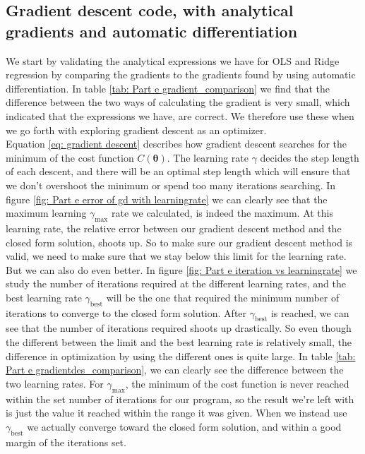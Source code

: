 \documentclass[reprint,english,notitlepage]{revtex4-2}  %
\begin{document}
\subsection{Gradient descent code, with analytical gradients and automatic differentiation} %

We start by validating the analytical expressions we have for OLS and Ridge regression by comparing the gradients to the gradients found by using automatic differentiation. In table \ref{tab: Part e gradient_comparison} we find that the difference between the two ways of calculating the gradient is very small, which indicated that the expressions we have, are correct. We therefore use these when we go forth with exploring gradient descent as an optimizer. \\
Equation \ref{eq: gradient descent} describes how gradient descent searches for the minimum of the cost function $C(\bm{\theta})$. The learning rate $\gamma$ decides the step length of each descent, and there will be an optimal step length which will ensure that we don't overshoot the minimum or spend too many iterations searching. In figure \ref{fig: Part e error of gd with learningrate} we can clearly see that the maximum learning $\gamma_{\text{max}}$ rate we calculated, is indeed the maximum. At this learning rate, the relative error between our gradient descent method and the closed form solution, shoots up. So to make sure our gradient descent method is valid, we need to make sure that we stay below this limit for the learning rate. \\
But we can also do even better. In figure \ref{fig: Part e iteration vs learningrate} we study the number of iterations required at the different learning rates, and the best learning rate $\gamma_{\text{best}}$ will be the one that required the minimum number of iterations to converge to the closed form solution. After $\gamma_{\text{best}}$ is reached, we can see that the number of iterations required shoots up drastically. So even though the different between the limit and the best learning rate is relatively small, the difference in optimization by using the different ones is quite large. In table \ref{tab: Part e gradientdes_comparison}, we can clearly see the difference between the two learning rates. For $\gamma_{\text{max}}$, the minimum of the cost function is never reached within the set number of iterations for our program, so the result we're left with is just the value it reached within the range it was given. When we instead use $\gamma_{\text{best}}$ we actually converge toward the closed form solution, and within a good margin of the iterations set.\\
\end{document}
